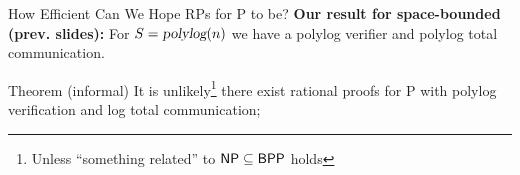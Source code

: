 \begin{frame}{How Efficient Can We Hope RPs for P to be?}
	\textbf{Our result for space-bounded (prev. slides):} For $S = {\textsl{polylog}}(n)$ we have a polylog verifier and polylog total communication.
	\pause
	\begin{block}{Theorem (informal)}
It is unlikely\footnote{Unless ``something related'' to ${\mathsf{NP}} \subseteq {\ensuremath{\mathsf{BPP}}}$ holds} there exist rational proofs for P with polylog verification and log total communication;
\end{block}
\end{frame}

